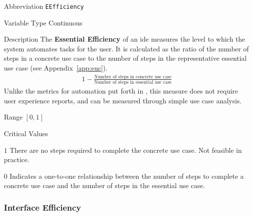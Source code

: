 \begin{AlignedDesc}
  \item[Abbreviation] \texttt{EEfficiency}

  \item[Variable Type] Continuous

  \item[Description] The \textbf{Essential Efficiency} of an \ac{ide}
  measures the level to which the system automates tasks for the user. It
  is calculated as the ratio of the number of steps in a concrete use case
  to the number of steps in the representative essential use case (see
  Appendix~\ref{app:euc}). \cite{constantine1996}
%
  \begin{align*}
    1 - \frac{\text{Number of steps in concrete use case}}
             {\text{Number of steps in essential use case}}
  \end{align*}
%
  Unlike the metrics for automation put forth in \cite{Wei1998}, this
  measure does not require user experience reports, and can be measured
  through simple use case analysis.

  \item[Range] $[0, 1]$

  \item[Critical Values]
  \begin{AlignedDesc}
    \item[$1$] There are no steps required to complete the concrete use
    case. Not feasible in practice.
    \item[$0$] Indicates a one-to-one relationship between the number of
    steps to complete a concrete use case and the number of steps in the
    essential use case.
  \end{AlignedDesc}

\end{AlignedDesc}

\subsubsection{Interface Efficiency}
\label{subsubsec:iefficiency}

